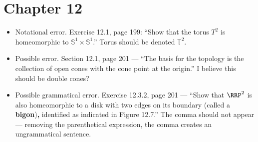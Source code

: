 \documentclass{fkletter}
\begin{document}
\section*{Chapter 12}
\begin{itemize}
  \item Notational error. Exercise 12.1, page 199: ``Show that the torus
    {\color{red}$T^2$} is homeomorphic to $\mathbb{S}^1 \times \mathbb{S}^1$.''
    Torus should be denoted $\mathbb{T}^2$.
\item Possible error. Section 12.1, page 201 --- ``The basis for the topology is
  the collection of {\color{red}open cones} with the cone point at the origin.''
  I believe this should be double cones?
  \item Possible grammatical error. Exercise 12.3.2, page 201 --- ``Show that
    $\RRP^2$ is also homeomorphic to a disk with two edges on its boundary
    (called a \textbf{bigon}){\bfseries \color{red},} identified as indicated in
    Figure 12.7.'' The comma should not appear --- removing the parenthetical
    expression, the comma creates an ungrammatical sentence.
\end{itemize}
\end{document}
